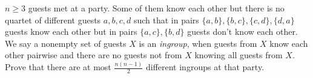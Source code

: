 $n\ge 3$ guests met at a party. Some of them know each other but there is no quartet of different guests $a, b, c, d$ such that in pairs $\lbrace a, b \rbrace, \lbrace b, c \rbrace, \lbrace c, d \rbrace, \lbrace d, a \rbrace$ guests know each other but in pairs $\lbrace a, c \rbrace, \lbrace b, d \rbrace$ guests don't know each other. We say a nonempty set of guests $X$ is an \textit{ingroup}, when guests from $X$ know each other pairwise and there are no guests not from $X$ knowing all guests from $X$. Prove that there are at most $\frac{n(n-1)}{2}$ different ingroups at that party.